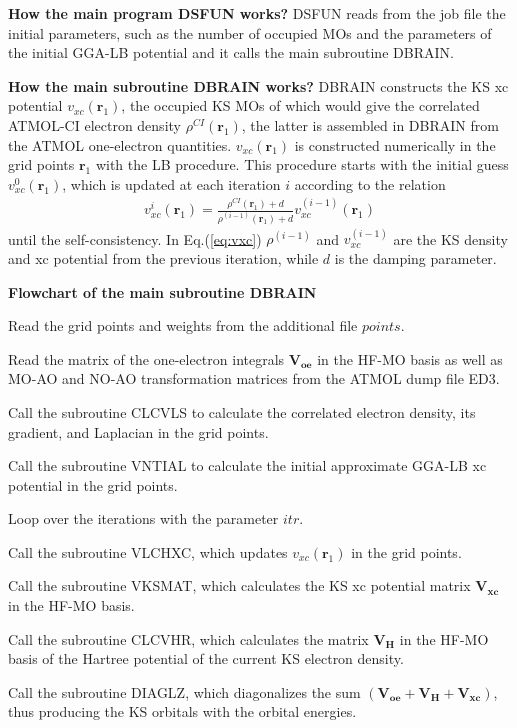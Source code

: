 \documentclass[onecolumn,preprintnumbers,amsmath,amssymb]{revtex4}
\newcommand{\mb}[1]{\boldsymbol{#1}}
\newcommand{\br}{\mb{r}}
\begin{document}
\textbf{How the main program DSFUN works?} DSFUN reads from the job file the initial parameters, such as the number of occupied MOs and the parameters of the initial GGA-LB potential and it calls the main subroutine DBRAIN. 

\textbf{How the main subroutine DBRAIN works?} DBRAIN constructs the KS xc potential $v_{xc}(\br_1)$, the occupied KS MOs of which would give the correlated ATMOL-CI electron density $\rho^{CI}(\br_1)$, the latter is assembled in DBRAIN from the ATMOL one-electron quantities.  $v_{xc}(\br_1)$ is constructed numerically in the grid points $\br_1$ with the LB procedure. This procedure starts with the initial guess $v_{xc}^0(\br_1)$, which is updated at each iteration $i$ according to the relation
\begin{align}
\label{eq:vxc}
v_{xc}^i(\br_1) = \frac{\rho^{CI}(\br_1)+d}{\rho^{(i-1)}(\br_1)+d}v_{xc}^{(i-1)}(\br_1)
\end{align}      
until the self-consistency. In Eq.(\ref{eq:vxc}) $\rho^{(i-1)}$ and $v_{xc}^{(i-1)}$ are the KS density and xc potential from the previous iteration, while $d$ is the damping parameter.  

\textbf{Flowchart of the main subroutine DBRAIN}

Read the grid points and weights from the additional file $points$. 

Read the matrix of the one-electron integrals $\mathbf{V_{oe}}$ in the HF-MO basis as well as MO-AO and NO-AO transformation matrices from the ATMOL dump file ED3. 

Call the subroutine CLCVLS to calculate the correlated electron density, its gradient, and Laplacian in the grid points.

Call the subroutine VNTIAL to calculate the initial approximate GGA-LB xc potential in the grid points.

Loop over the iterations with the parameter $itr$.

Call the subroutine VLCHXC, which updates $v_{xc}(\br_1)$ in the grid points.

Call the subroutine VKSMAT, which calculates the KS xc potential matrix $\mathbf{V_{xc}}$ in the HF-MO basis.

Call the subroutine CLCVHR, which calculates the matrix $\mathbf{V_{H}}$ in the HF-MO basis of the Hartree potential of the current KS electron density. 

Call the subroutine DIAGLZ, which diagonalizes the sum $(\mathbf{V_{oe}}+\mathbf{V_{H}}+\mathbf{V_{xc}})$, thus producing the KS orbitals with the orbital energies.
\end{document}
